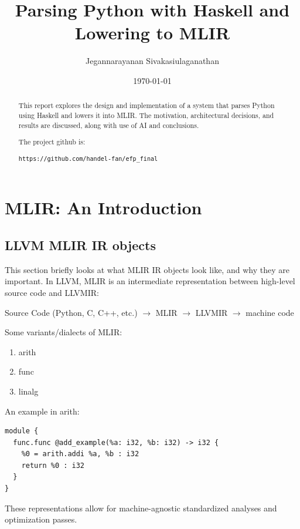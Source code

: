\documentclass[11pt]{article}
\title{Parsing Python with Haskell and Lowering to MLIR}
\author{Jegannarayanan Sivakasiulaganathan}
\date{\today}
\begin{document}
\maketitle

\begin{abstract}
	This report explores the design and implementation of a system that parses
	Python using Haskell and lowers it into MLIR. The motivation, architectural
	decisions, and results are discussed, along with use of AI and conclusions.

	The project github is:
	\begin{verbatim}
https://github.com/handel-fan/efp_final
  \end{verbatim}

\end{abstract}

\tableofcontents
\newpage

\section{MLIR: An Introduction}
\subsection{LLVM MLIR IR objects}
This section briefly looks at what MLIR IR objects look like, and why they are
important. In LLVM, MLIR is an intermediate representation between high-level
source code and LLVMIR:

\noindent Source Code (Python, C, C++, etc.) $\to$ MLIR $\to$ LLVMIR $\to$ machine code

\noindent Some variants/dialects of MLIR:

\begin{enumerate}
	\item arith
	\item func
	\item linalg
\end{enumerate}

\noindent An example in arith:
\begin{verbatim}
module {
  func.func @add_example(%a: i32, %b: i32) -> i32 {
    %0 = arith.addi %a, %b : i32
    return %0 : i32
  }
}
\end{verbatim}

\noindent These representations allow for machine-agnostic standardized analyses and optimization passes.
\end{document}
